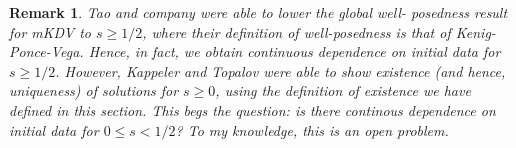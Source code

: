 \documentclass[12pt,reqno]{amsart}
\numberwithin{equation}{section}  %
\newtheorem{remark}[theorem]{Remark}
\begin{document}
\begin{framed}
  \begin{remark}
    Tao and company \cite{Colliander:2003kx} were able to lower the global well-
    posedness result for mKDV to $s \ge 1/2$, where their definition of
    well-posedness is that of Kenig-Ponce-Vega. Hence, in
    fact, we obtain continuous dependence on initial data for $s \ge 1/2$.
    However, Kappeler and Topalov \cite{Kappeler:2005kx}
    were able to show existence (and hence,
    uniqueness) of solutions for
    $s \ge 0$, using the definition of existence we have defined in this
    section. This begs the question: is there continous dependence on initial
    data for $0 \le s
    < 1/2$? To my knowledge, this is an open problem.
    \label{rem:tao}
  \end{remark}
  \end{framed}

  

  
\end{document}
